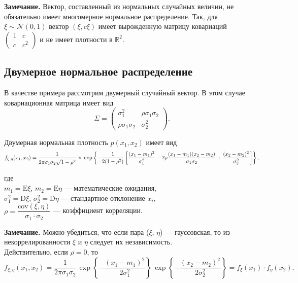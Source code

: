 \documentclass[11pt,a4paper]{article}
\begin{document}
    \textbf{Замечание.} Вектор, составленный из нормальных случайных
величин, не обязательно имеет многомерное нормальное распределение. Так,
для \(\xi \sim \mathcal{N}(0,1)\) вектор \((\xi, c\xi)\) имеет
вырожденную матрицу ковариаций
\(\begin{pmatrix}  1 & c \\  c & c^2 \end{pmatrix}\) и не имеет
плотности в \(\mathbb{R}^2\).

    \hypertarget{ux434ux432ux443ux43cux435ux440ux43dux43eux435-ux43dux43eux440ux43cux430ux43bux44cux43dux43eux435-ux440ux430ux441ux43fux440ux435ux434ux435ux43bux435ux43dux438ux435}{%
\subsection{Двумерное нормальное
распределение}\label{ux434ux432ux443ux43cux435ux440ux43dux43eux435-ux43dux43eux440ux43cux430ux43bux44cux43dux43eux435-ux440ux430ux441ux43fux440ux435ux434ux435ux43bux435ux43dux438ux435}}

В качестве примера рассмотрим двумерный случайный вектор. В этом случае
ковариационная матрица имеет вид \[
\Sigma = 
\begin{pmatrix}
    \sigma_1^2 & \rho \sigma_1 \sigma_2 \\
    \rho \sigma_1 \sigma_2 & \sigma_2^2 
\end{pmatrix}.
\]

    Двумерная нормальная плотность \(p(x_1, x_2)\) имеет вид \[
  f_{\xi,\eta}(x_1, x_2) = \frac{1}{2\pi\sigma_1\sigma_2\sqrt{1-\rho^2}} \times \\
  \exp \left\{-\frac{1}{2(1-\rho^2)} \left[ \frac{(x_1-m_1)^2}{\sigma_1^2} - 2\rho\frac{(x_1-m_1)(x_2-m_2)}{\sigma_1\sigma_2} + \frac{(x_2-m_2)^2}{\sigma_2^2} \right]\right\},
\]

где\\
\(m_1 = \mathrm{E} \xi\), \(m_2 = \mathrm{E} \eta\) --- математические
ожидания,\\
\(\sigma_1^2 = \mathrm{D} \xi\), \(\sigma_2^2 = \mathrm{D} \eta\) ---
стандартное отклонение \(x_i\),\\
\(\rho = \dfrac{\mathrm{cov}(\xi, \eta)}{\sigma_1 \cdot \sigma_2}\) ---
коэффициент корреляции.

\textbf{Замечание.} Можно убедиться, что если пара (\(\xi\), \(\eta\))
--- гауссовская, то из некоррелированности \(\xi\) и \(\eta\) следует их
независимость.\\
Действительно, если \(\rho=0\), то
\[
  f_{\xi,\eta}(x_1, x_2) = \frac{1}{2\pi\sigma_1\sigma_2} \, \exp\left\{-\frac{(x_1-m_1)^2}{2\sigma_1^2}\right\} \, \exp\left\{-\frac{(x_2-m_2)^2}{2\sigma_2^2}\right\}
  = f_\xi(x_1) \cdot f_{\eta}(x_2).
\]
\end{document}
